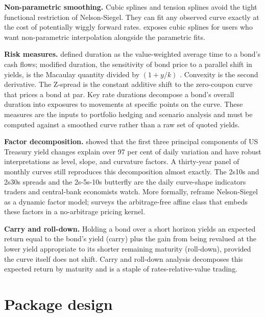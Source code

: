 \textbf{Non-parametric smoothing.} Cubic splines
\citep{mcculloch1971measuring} and tension splines
\citep{fisher1995fitting} avoid the tight functional restriction of
Nelson-Siegel. They can fit any observed curve exactly at the cost
of potentially wiggly forward rates.  exposes
 cubic splines for users who want
non-parametric interpolation alongside the parametric fits.

\textbf{Risk measures.} \citet{macaulay1938movements} defined duration as the
value-weighted average time to a bond's cash flows; modified
duration, the sensitivity of bond price to a parallel shift in
yields, is the Macaulay quantity divided by \((1 + y/k)\)
\citep{hicks1939value}. Convexity is the second derivative. The
Z-spread is the constant additive shift to the zero-coupon curve
that prices a bond at par. Key rate durations \citep{ho1992key}
decompose a bond's overall duration into exposures to movements at
specific points on the curve. These measures are the inputs to
portfolio hedging and scenario analysis and must be computed
against a smoothed curve rather than a raw set of quoted yields.

\textbf{Factor decomposition.} \citet{litterman1991common} showed that the
first three principal components of US Treasury yield changes
explain over 97 per cent of daily variation and have robust
interpretations as level, slope, and curvature factors. A
thirty-year panel of monthly curves still reproduces this
decomposition almost exactly. The 2s10s and 2s30s spreads and the
2s-5s-10s butterfly are the daily curve-shape indicators traders
and central-bank economists watch. More formally,
\citet{diebold2006forecasting} reframe Nelson-Siegel as a dynamic factor
model; \citet{piazzesi2010affine} surveys the arbitrage-free affine class
that embeds these factors in a no-arbitrage pricing kernel.

\textbf{Carry and roll-down.} Holding a bond over a short horizon
yields an expected return equal to the bond's yield (carry) plus
the gain from being revalued at the lower yield appropriate to its
shorter remaining maturity (roll-down), provided the curve itself
does not shift. Carry and roll-down analysis decomposes this
expected return by maturity and is a staple of
rates-relative-value trading.

\section{Package design}\label{package-design}

